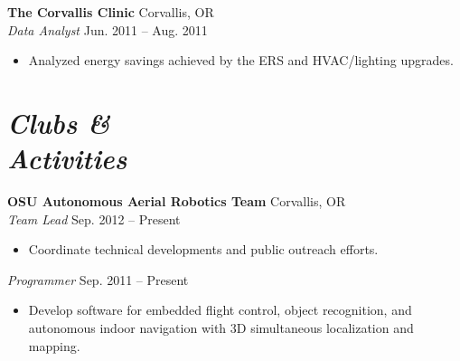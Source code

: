 \documentclass[10pt,letterpaper,margin]{res}
\begin{document}
\begin{resume}
{\bf The Corvallis Clinic} \hfill {\color{lightgray} Corvallis, OR} \\
{\it Data Analyst} \hfill {\color{lightgray} Jun. 2011 -- Aug. 2011}\vspace{0.2em}

\begin{itemize}
	\item Analyzed energy savings achieved by the ERS and HVAC/lighting
		upgrades.
\end{itemize}



\section{\large\itshape Clubs \& \\ Activities}

{\bf OSU Autonomous Aerial Robotics Team} \hfill {\color{lightgray} Corvallis, OR} \\
{\it Team Lead} \hfill {\color{lightgray} Sep. 2012 -- Present}\vspace{0.2em}

\begin{itemize}
	\item Coordinate technical developments and public outreach efforts.
\end{itemize}

{\it Programmer} \hfill {\color{lightgray} Sep. 2011 -- Present}\vspace{0.2em}

\begin{itemize}
	\item Develop software for embedded flight control, object recognition, and
		autonomous indoor navigation with 3D simultaneous localization and
		mapping.
\end{itemize}


% 



\end{resume}
\end{document}

